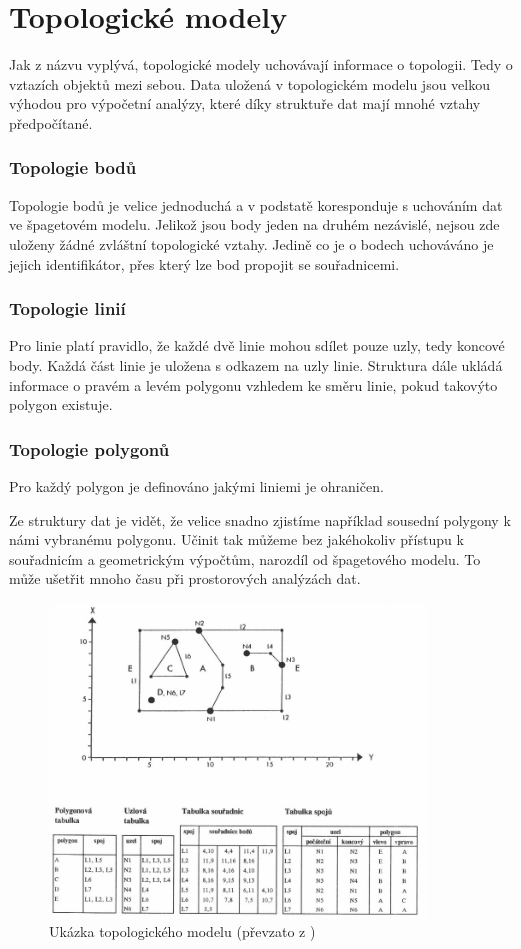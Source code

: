 \section{Topologické modely}
	Jak z názvu vyplývá, topologické modely uchovávají informace o topologii. Tedy o vztazích objektů mezi sebou. Data uložená v topologickém modelu jsou velkou výhodou pro výpočetní analýzy, které díky struktuře dat mají mnohé vztahy předpočítané.

\subsubsection{Topologie bodů}
	Topologie bodů je velice jednoduchá a v podstatě koresponduje s uchováním dat ve špagetovém modelu. Jelikož jsou body jeden na druhém nezávislé, nejsou zde uloženy žádné zvláštní topologické vztahy. Jedině co je o bodech uchováváno je jejich identifikátor, přes který lze bod propojit se souřadnicemi.
	
\subsubsection{Topologie linií}
	Pro linie platí pravidlo, že každé dvě linie mohou sdílet pouze uzly, tedy koncové body. Každá část linie je uložena s odkazem na uzly linie. Struktura dále ukládá informace o pravém a levém polygonu vzhledem ke směru linie, pokud takovýto polygon existuje.

\subsubsection{Topologie polygonů}
	Pro každý polygon je definováno jakými liniemi je ohraničen. 
	
Ze struktury dat je vidět, že velice snadno zjistíme například sousední polygony k námi vybranému polygonu. Učinit tak můžeme bez jakéhokoliv přístupu k souřadnicím a geometrickým výpočtům, narozdíl od špagetového modelu. To může ušetřit mnoho času při prostorových analýzách dat. \cite{QGIS_software} \cite{tucek1997geograficke} \cite{kolar2003geograficke} \cite{vesely2007thesis}

\begin{figure}[h]
  \centering
  \includegraphics[width=10cm]{./pictures/3/topo_model.png}
  \caption{Ukázka topologického modelu (převzato z \cite{kolar2003geograficke})}
  \label{fig:3-time_complexity}
\end{figure}
